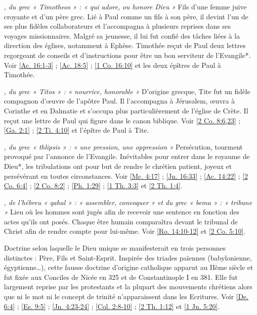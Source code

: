 \begin{multicols}{2}
\textit{, du grec « Timotheos » : « qui adore, ou honore Dieu »}\newline
Fils d'une femme juive croyante et d'un père grec. Lié à Paul comme un fils à son père, il devint l'un de ses plus fidèles collaborateurs et l'accompagna à plusieurs reprises dans ses voyages missionnaires. Malgré sa jeunesse, il lui fut confié des tâches liées à la direction des églises, notamment à Ephèse. Timothée reçut de Paul deux lettres regorgeant de conseils et d'instructions pour être un bon serviteur de l'Evangile*. Voir \vref{Ac. 16:1-3} ; \vref{Ac. 18:5} ; \vref{1 Co. 16:10} et les deux épîtres de Paul à Timothée.

\textit{, du grec « Titos » : « nourrice, honorable »}\newline
D'origine grecque, Tite fut un fidèle compagnon d'œuvre de l'apôtre Paul. Il l'accompagna à Jérusalem, œuvra à Corinthe et en Dalmatie et s'occupa plus particulièrement de l'église de Crète. Il reçut une lettre de Paul qui figure dans le canon biblique. Voir \vref{2 Co. 8:6,23} ; \vref{Ga. 2:1} ; \vref{2 Ti. 4:10} et l'épître de Paul à Tite.

\textit{, du grec « thlipsis » : « une pression, une oppression »}\newline
Persécution, tourment provoqué par l'annonce de l'Evangile. Inévitables pour entrer dans le royaume de Dieu*, les tribulations ont pour but de rendre le chrétien patient, joyeux et persévérant en toutes circonstances. Voir \vref{Mc. 4:17} ; \vref{Jn. 16:33} ; \vref{Ac. 14:22} ; \vref{2 Co. 6:4} ; \vref{2 Co. 8:2} ; \vref{Ph. 1:29} ; \vref{1 Th. 3:3} et \vref{2 Th. 1:4}.

\textit{, de l'hébreu « qahal » : « assembler, convoquer » et du grec « bema » : « tribune »}\newline
Lieu où les hommes sont jugés afin de recevoir une sentence en fonction des actes qu'ils ont posés. Chaque être humain comparaîtra devant le tribunal de Christ afin de rendre compte pour lui-même. Voir \vref{Ro. 14:10-12} et \vref{2 Co. 5:10}.

\textit{}\newline
Doctrine selon laquelle le Dieu unique se manifesterait en trois personnes distinctes : Père, Fils et Saint-Esprit. Inspirée des triades païennes (babylonienne, égyptienne…), cette fausse doctrine d'origine catholique apparut au IIème siècle et fut fixée aux Conciles de Nicée en 325 et de Constantinople I en 381. Elle fut largement reprise par les protestants et la plupart des mouvements chrétiens alors que ni le mot ni le concept de trinité n'apparaissent dans les Ecritures. Voir \vref{De. 6:4} ; \vref{Es. 9:5} ; \vref{Jn. 4:23-24} ; \vref{Col. 2:8-10} ; \vref{2 Th. 1:12} et \vref{1 Jn. 5:20}.


\end{multicols}
